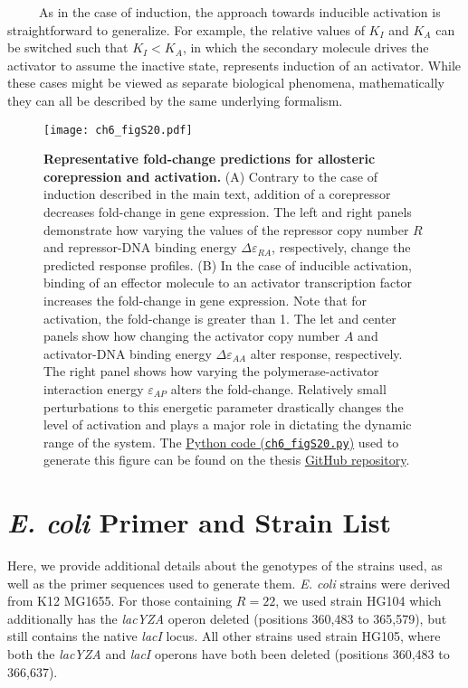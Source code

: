 \documentclass[12pt]{caltech_thesis}
\begin{document}
~~~~~As in the case of induction, the approach towards inducible
activation is straightforward to generalize. For example, the relative
values of \(K_I\) and \(K_A\) can be switched such that \(K_I < K_A\),
in which the secondary molecule drives the activator to assume the
inactive state, represents induction of an activator. While these cases
might be viewed as separate biological phenomena, mathematically they
can all be described by the same underlying formalism.

\hypertarget{fig:applications}{%
\begin{figure}
\centering
\texttt{[image: ch6\_figS20.pdf]}
\caption[{Representative fold-change predictions for allosteric
corepression and activation.}]{\textbf{Representative fold-change
predictions for allosteric corepression and activation.} (A) Contrary to
the case of induction described in the main text, addition of a
corepressor decreases fold-change in gene expression. The left and right
panels demonstrate how varying the values of the repressor copy number
\(R\) and repressor-DNA binding energy \(\Delta\varepsilon_{RA}\),
respectively, change the predicted response profiles. (B) In the case of
inducible activation, binding of an effector molecule to an activator
transcription factor increases the fold-change in gene expression. Note
that for activation, the fold-change is greater than 1. The let and
center panels show how changing the activator copy number \(A\) and
activator-DNA binding energy \(\Delta\varepsilon_{AA}\) alter response,
respectively. The right panel shows how varying the polymerase-activator
interaction energy \(\varepsilon_{AP}\) alters the fold-change.
Relatively small perturbations to this energetic parameter drastically
changes the level of activation and plays a major role in dictating the
dynamic range of the system. The
\href{https://github.com/gchure/phd/blob/master/src/chapter_06/code/ch6_figS20.py}{Python
code (\texttt{ch6\_figS20.py})} used to generate this figure can be
found on the thesis \href{https://github.com/gchure/phd}{GitHub
repository}.}
\label{fig:applications}
\end{figure}
}

\hypertarget{e.-coli-primer-and-strain-list}{%
\section{\texorpdfstring{\emph{E. coli} Primer and Strain
List}{E. coli Primer and Strain List}}\label{e.-coli-primer-and-strain-list}}

Here, we provide additional details about the genotypes of the strains
used, as well as the primer sequences used to generate them. \emph{E.
coli} strains were derived from K12 MG1655. For those containing
\(R=22\), we used strain HG104 which additionally has the \emph{lacYZA}
operon deleted (positions 360,483 to 365,579), but still contains the
native \emph{lacI} locus. All other strains used strain HG105, where
both the \emph{lacYZA} and \emph{lacI} operons have both been deleted
(positions 360,483 to 366,637).
\end{document}
